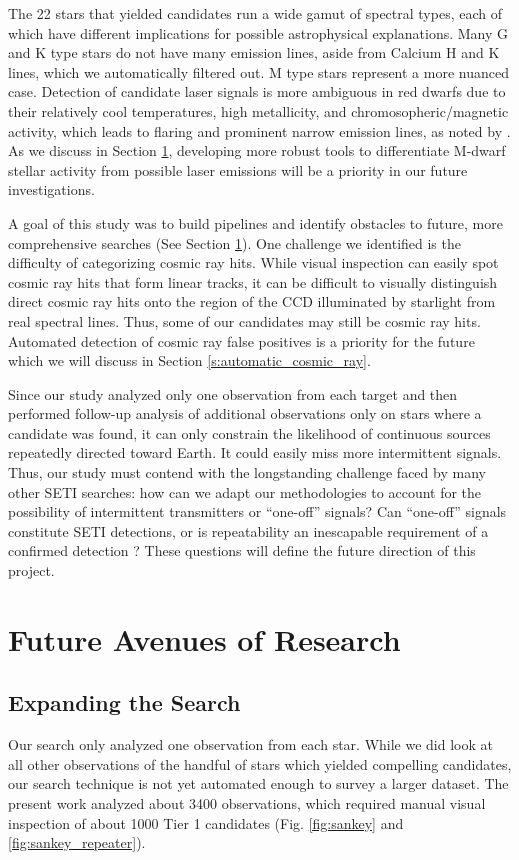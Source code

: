 \documentclass[twocolumn]{aastex701}
\begin{document}
The 22 stars that yielded candidates run a wide gamut of spectral types, each of which have different implications for possible astrophysical explanations. Many G and K type stars do not have many emission lines, aside from  Calcium H and K lines, which we automatically filtered out. M type stars represent a more nuanced case. Detection of candidate laser signals is more ambiguous in red dwarfs due to their relatively cool temperatures, high metallicity, and chromosopheric/magnetic activity, which leads to flaring and prominent narrow emission lines, as noted by \citep{Marcy_2021}. As we discuss in Section \ref{s:future}, developing more robust tools to differentiate M-dwarf stellar activity from possible laser emissions will be a priority in our future investigations. 

A goal of this study was to build pipelines and identify obstacles to future, more comprehensive searches (See Section \ref{s:future}).  One challenge we identified is the difficulty of categorizing cosmic ray hits.  While visual inspection can easily spot cosmic ray hits that form linear tracks, it can be difficult  to visually distinguish direct cosmic ray hits onto the region of the CCD illuminated by starlight from real spectral lines.  Thus, some of our candidates may still be cosmic ray hits.  Automated detection of cosmic ray false positives is a priority for the future which we will discuss in Section \ref{s:automatic_cosmic_ray}. 

Since our study analyzed only one observation from each target and then performed follow-up analysis of additional observations only on stars where a candidate was found, it can only constrain the likelihood of continuous sources repeatedly directed toward Earth. It could easily miss more intermittent signals. Thus, our study must contend with the longstanding challenge faced by many other SETI searches: how can we adapt our methodologies to account for the possibility of intermittent transmitters or \enquote{one-off} signals?  Can \enquote{one-off} signals constitute SETI detections, or is repeatability an inescapable requirement of a confirmed detection \citep{2019nasatechnosignatures, Wow!Signal}? These questions will define the future direction of this project.

\section{Future Avenues of Research}
\label{s:future}

\subsection{Expanding the Search}
Our search only analyzed one observation from each star. While we did look at all other observations of the handful of stars which yielded compelling candidates, our search technique is not yet automated enough to survey a larger dataset.  The present work analyzed about 3400 observations, which required manual visual inspection of about 1000 Tier 1 candidates (Fig. \ref{fig:sankey} and \ref{fig:sankey_repeater}).
\end{document}
